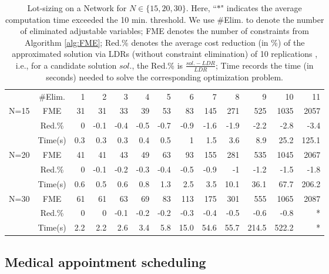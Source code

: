 \documentclass[fleqn,mnsc,blindrev]{informs4}
\begin{document}
\begin{table}[t]
			\centering
			\caption{Lot-sizing on a Network for $N\in \{15,20,30\}$. Here, ``$*$" indicates the average computation time exceeded the 10 min. threshold. We use \#Elim. to denote the number of eliminated adjustable variables; FME denotes the number of constraints from Algorithm \ref{alg:FME}; Red.\% denotes the average cost reduction (in \%) of the approximated solution via LDRs (without constraint elimination) of 10 replications , i.e., for a candidate solution $sol.$, the Red.\% is $\frac{sol. - LDR}{LDR}$; Time records the time (in seconds) needed to solve the corresponding optimization problem.}
\def\arraystretch{1.3}			\begin{tabular}{cc|rrrrrrrrrrr}
				\cline{2-13}
				& \#Elim. & 1     & 2     & 3     & 4     & 5     & 6     & 7     & 8     & 9     & 10    & 11 \\ \cline{2-13}
				\multirow{3}{*}{N=15} &  FME  & 31     & 31  & 33     & 39     & 53     & 83     & 145     & 271     & 525     & 1035    & 2057   \\ 
				 & Red.\% & 0     & -0.1  & -0.4  & -0.5  & -0.7  & -0.9  & -1.6  & -1.9  & -2.2  & -2.8  & -3.4 \\
				& Time(s)  & 0.3   & 0.3   & 0.3   & 0.4   & 0.5   & 1     & 1.5   & 3.6   & 8.9   & 25.2  & 125.1 \\ \cline{2-13}
			\multirow{3}{*}{N=20} &  FME  & 41     & 41  & 43     & 49     & 63     & 93     & 155     & 281     & 535     & 1045    & 2067   \\ 
				 & Red.\% & 0     & -0.1  & -0.2  & -0.3  & -0.4  & -0.5  & -0.9  & -1    & -1.2  & -1.5  & -1.8 \\
				& Time(s)  & 0.6   & 0.5   & 0.6   & 0.8   & 1.3   & 2.5   & 3.5   & 10.1  & 36.1  & 67.7  & 206.2 \\ \cline{2-13}
			\multirow{3}{*}{N=30} &  FME  & 61     & 61  & 63     & 69     & 83     & 113     & 175     & 301     & 555     & 1065    & 2087   \\
				 & Red.\% & 0     & 0     & -0.1  & -0.2  & -0.2  & -0.3  & -0.4  & -0.5  & -0.6  & -0.8  & * \\
				& Time(s)  & 2.2   & 2.2   & 2.6   & 3.4   & 5.8   & 15.0  & 54.6  & 55.7  & 214.5 & 522.2   & * \\ \cline{2-13}
			\end{tabular}%
			\label{tab:lsonb}%
		\end{table}%
		
		
		\subsection{Medical appointment scheduling} \label{sec:asproblem}
		
\end{document}
